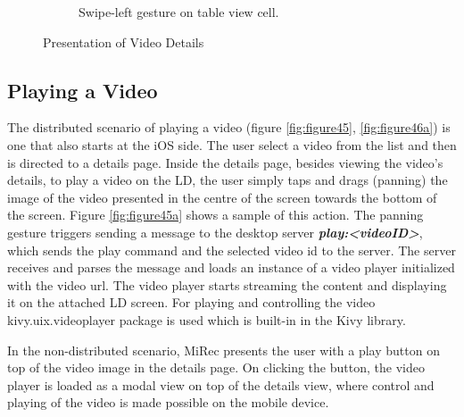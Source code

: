 \begin{figure}[!htpb]
\begin{subfigure}[b]{0.3\textwidth}
        \caption{Swipe-left gesture on table view cell.}
        \label{fig:figure44b}
    \end{subfigure}
   \caption{Presentation of Video Details}\label{fig:figure44}
\end{figure}
\subsection{Playing a Video}
The distributed scenario of playing a video (figure \ref{fig:figure45},
\ref{fig:figure46a}) is one that also starts at the iOS side. The user select a
video from the list and then is directed to a details page. Inside the details
page, besides viewing the video's details, to play a video on the LD, the user
simply taps and drags (panning) the image of the video presented in the centre
of the screen towards the bottom of the screen. Figure \ref{fig:figure45a} shows a sample
of this action. The panning gesture triggers sending a message to the desktop
server \textbf{\textit{play:<videoID>}}, which sends the play command and the selected video id to the server. The server receives and parses the message and loads an instance of a video player initialized with the video url. The video player starts streaming the content and displaying it on the attached LD screen. For playing and controlling the video kivy.uix.videoplayer package is used which is built-in in the Kivy library.\par
In the non-distributed scenario, MiRec presents the user with a play button on
top of the video image in the details page. On clicking the button, the video player is loaded as a modal view on top of the details view, where control and playing of the video is made possible on the mobile device.
